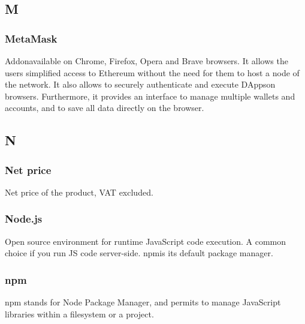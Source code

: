 

\subsection*{M}

\subsubsection*{MetaMask}
Addon\glosp available on Chrome, Firefox, Opera and Brave browsers.
It allows the users simplified access to Ethereum without the need for them to host a node of the network.
It also allows to securely authenticate and execute DApps\glosp on browsers.
Furthermore, it provides an interface to manage multiple wallets and accounts, and to save all data directly on the browser.


\subsection*{N}

\subsubsection*{Net price}
Net price of the product, VAT excluded.

\subsubsection*{Node.js}
Open source environment for runtime JavaScript code execution. A common choice if you run JS code server-side. npm\glosp is its default package manager.

\subsubsection*{npm}
npm stands for Node Package Manager, and permits to manage JavaScript libraries within a filesystem or a project.




